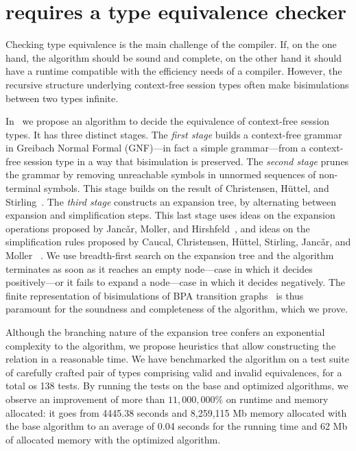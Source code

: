 \section{\freest{} requires a type equivalence checker}
\label{sec:equivalence}

Checking type equivalence is the main challenge of the
compiler. If, on the one hand, the algorithm should be sound and 
complete, on the other hand it should have a runtime compatible
with the efficiency needs of a compiler.
However, the recursive structure underlying context-free 
session types often make bisimulations between two types infinite. 

In~\cite{typeEquivalence} we propose an algorithm to decide
the equivalence of context-free session types. 
It has three distinct stages.
%
The \emph{first stage} builds a context-free grammar in Greibach
Normal Formal (GNF)---in fact a simple grammar---from a context-free
session type in a way that bisimulation is preserved.  
%
The \emph{second stage} prunes the grammar by removing unreachable
symbols in unnormed sequences of non-terminal symbols. This stage
builds on the result of Christensen, H\"uttel, and 
Stirling~\cite{DBLP:journals/iandc/ChristensenHS95}.
%
The \emph{third stage} constructs an expansion tree, by alternating
between expansion and simplification steps.  This last stage uses
ideas on the expansion operations proposed by Janc\v ar, Moller, and
Hirshfeld~\cite{hirshfeld1996bisimulation,janvcar1999techniques}, and
ideas on the simplification rules proposed by Caucal, Christensen,
H\"uttel, Stirling, Janc\v ar, and Moller
~\cite{caucal1986decidabilite,
  DBLP:journals/iandc/ChristensenHS95,janvcar1999techniques}.  
We use breadth-first search on the expansion tree and the 
algorithm terminates as soon as it reaches an empty node---case
in which it decides positively---or it fails to expand a node---case
in which it decides negatively.  
The
finite representation of bisimulations of BPA transition
graphs~\cite{caucal1986decidabilite, DBLP:journals/iandc/ChristensenHS95} 
is thus paramount for the soundness and completeness of the algorithm,
which we prove. 

Although the branching nature of the expansion tree confers an exponential 
complexity to the algorithm, we propose heuristics that allow constructing 
the relation in a reasonable time. We have benchmarked the algorithm 
on a test suite of carefully crafted pair of types comprising valid and invalid 
equivalences, for a total os 138 tests. By running the tests on the base and
optimized algorithms, we observe an improvement of more than 
$11,000,000\%$ on runtime and memory allocated: it goes from 4445.38 
seconds and 8,259,115 Mb memory allocated
with the base algorithm to an average of 0.04
seconds for the running time and 62 Mb of allocated memory with the 
optimized algorithm.

